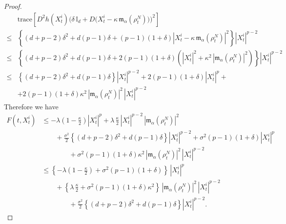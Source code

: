\documentclass[12pt]{amsart}
\numberwithin{equation}{section}
\begin{document}
\begin{proof}
\begin{align*}
    & 
    \text{trace}\left[D^{2}h(X^{i}_{t}) \bigg( \delta\,\mathds{I}_{d} + D\big(X^{i}_{t} - \kappa\,\mathfrak{m}_{\alpha}(\rho^{N}_{t})\big) \bigg)^{2} \right]\\
    \leq& \left\{ (d+p-2)\delta^{2} + d(p-1)\delta + (p-1)\left(1+\delta\right)|X^{i}_{t} - \kappa\,\mathfrak{m}_{\alpha}(\rho^{N}_{t})|^{2}\right\} |X^{i}_{t}|^{p-2}\\
    \leq& \left\{ (d+p-2)\delta^{2} + d(p-1)\delta + 2(p-1)\left(1+\delta\right)(|X^{i}_{t}|^{2} + \kappa^{2}\,|\mathfrak{m}_{\alpha}(\rho^{N}_{t})|^{2})\right\} |X^{i}_{t}|^{p-2}\\
    \leq&\left\{ (d+p-2)\delta^{2} + d(p-1)\delta\right\}|X^{i}_{t}|^{p-2} 
    + 2(p-1)\left(1+\delta\right) |X^{i}_{t}|^{p} +
     \\
    & +2(p-1)\left(1+\delta\right)\kappa^{2}\,|\mathfrak{m}_{\alpha}(\rho^{N}_{t})|^{2}\, |X^{i}_{t}|^{p-2}
\end{align*}
Therefore we have
\begin{align*}
    F(t,X^{i}_{t}) 
    & \leq -\lambda\left(1 -\frac{\kappa}{2}\right) |X^{i}_{t}|^{p} + \lambda\,\frac{\kappa}{2}\,|X^{i}_{t}|^{p-2}\,|\mathfrak{m}_{\alpha}(\rho^{N}_{t})|^{2} \\
    & \quad \quad +\frac{\sigma^{2}}{2}\left\{ (d+p-2)\delta^{2} + d(p-1)\delta\right\}|X^{i}_{t}|^{p-2} 
    + \sigma^{2}(p-1)\left(1+\delta\right) |X^{i}_{t}|^{p} 
     \\
    & \quad \quad \quad \quad +\sigma^{2}(p-1) \left( 1+\delta \right) \kappa^{2} \, |\mathfrak{m}_{\alpha} (\rho^{N}_{t})|^{2}\, |X^{i}_{t}|^{p-2}\\
    & \leq \left\{ -\lambda\left(1 -\frac{\kappa}{2}\right) + \sigma^{2}(p-1)\left(1+\delta\right) \right\}\,|X^{i}_{t}|^{p}  \\
    & \quad \quad + \left\{ \lambda\,\frac{\kappa}{2} + \sigma^{2}(p-1)\left(1+\delta\right)\kappa^{2} \right\}\,|\mathfrak{m}_{\alpha}(\rho^{N}_{t})|^{2}\, |X^{i}_{t}|^{p-2}\\
    & \quad \quad \quad \quad + \frac{\sigma^{2}}{2}\left\{ (d+p-2)\delta^{2} + d(p-1)\delta\right\}|X^{i}_{t}|^{p-2}.
\end{align*}


\end{proof}
\end{document}

